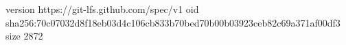 version https://git-lfs.github.com/spec/v1
oid sha256:70c07032d8f18eb03d4c106cb833b70bed70b00b03923ceb82c69a371af00df3
size 2872
